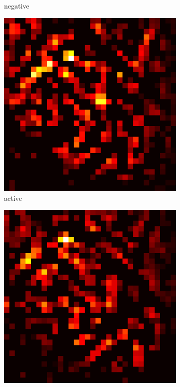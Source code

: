 \documentclass[preprint,12pt]{elsarticle}
\begin{document}
\begin{figure}
\begin{subfigure}{0.14\textwidth}
        \caption{negative}
    \end{subfigure}
    \hfill
    \begin{subfigure}{0.14\textwidth}
        \centering
        \includegraphics[width=\linewidth]{../visualizations/examples/cifar10/resnet18/active_saliency_map/6.png}
        \caption{active}
    \end{subfigure}
    \hfill
    \begin{subfigure}{0.14\textwidth}
        \centering
        \includegraphics[width=\linewidth]{../visualizations/examples/cifar10/resnet18/inactive_saliency_map/6.png}

\end{subfigure}
\end{figure}
\end{document}
